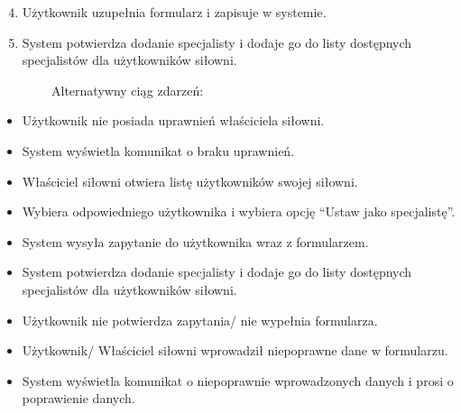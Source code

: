 \documentclass[
]{article}
\providecommand{\tightlist}{%
  \setlength{\itemsep}{0pt}\setlength{\parskip}{0pt}}
\begin{document}
\begin{enumerate}
\setcounter{enumi}{3}
\tightlist
\item
  {Użytkownik uzupełnia formularz i zapisuje w systemie.}
\item
  {System potwierdza dodanie specjalisty i dodaje go do listy dostępnych
  specjalistów dla użytkowników siłowni.}
\end{enumerate}

{~~~~~~~~Alternatywny ciąg zdarzeń:}

\begin{itemize}
\tightlist
\item
  {Użytkownik nie posiada uprawnień właściciela siłowni.}
\end{itemize}

\begin{itemize}
\tightlist
\item
  {System wyświetla komunikat o braku uprawnień.}
\end{itemize}

\begin{itemize}
\tightlist
\item
  {Właściciel siłowni otwiera listę użytkowników swojej siłowni.}
\end{itemize}

\begin{itemize}
\tightlist
\item
  {Wybiera odpowiedniego użytkownika i wybiera opcję ``Ustaw jako
  specjalistę''.}
\item
  {System wysyła zapytanie do użytkownika wraz z formularzem.}
\item
  {System potwierdza dodanie specjalisty i dodaje go do listy dostępnych
  specjalistów dla użytkowników siłowni.}
\end{itemize}

\begin{itemize}
\tightlist
\item
  {Użytkownik nie potwierdza zapytania/ nie wypełnia formularza.}
\item
  {Użytkownik/ Właściciel siłowni wprowadził niepoprawne dane w
  formularzu.}
\end{itemize}

\begin{itemize}
\tightlist
\item
  {System wyświetla komunikat o niepoprawnie wprowadzonych danych i
  prosi o poprawienie danych.\\
  }
\end{itemize}
\end{document}
